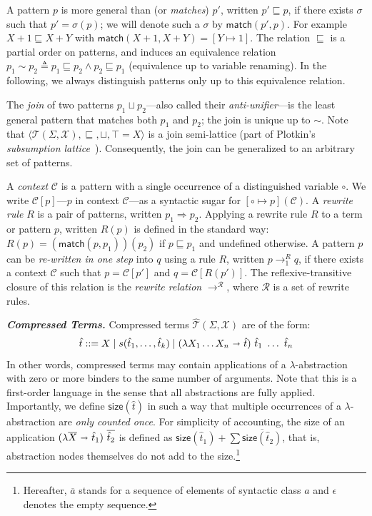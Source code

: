 \documentclass[acmsmall,screen,nonacm,review=false,timestamp=false]{acmart}
\newcommand{\emphbf}[1]{\emph{\textbf{#1}\xspace}}
\newcommand{\mypara}[1]{\smallskip\noindent\emphbf{#1.}\xspace}
\newcommand{\many}[1]{\overline{#1}}
\newcommand{\sz}{\mathsf{size}}
\newcommand{\patsof}[2]{\mathcal{T}(#1,#2)}
\newcommand{\absof}[2]{\hat{\mathcal{T}}(#1,#2)}
\newcommand{\subst}[2]{{#1} \mapsto {#2}}
\newcommand{\sapp}[2]{{#1}({#2})}
\newcommand{\sub}{\sqsubseteq}
\newcommand{\join}{\sqcup}
\newcommand{\bnd}{\ \mathbf{\shortrightarrow}\ }
\newcommand{\match}[2]{\mathsf{match}(#1,#2)}
\newcommand{\rwsteps}[1]{\rightarrow^{#1}_1}
\newcommand{\rewrites}[1]{\rightarrow^{#1}}
\newcommand{\emptyseq}{\epsilon}
\newcommand{\ctx}{\mathcal{C}}
\newcommand{\ruleset}{\mathcal{R}}
\begin{document}
A pattern $p$ is more general than (or \emph{matches}) $p'$,
written $p' \sub p$,
if there exists $\sigma$ such that $p' = \sapp{\sigma}{p}$;
we will denote such a $\sigma$ by $\match{p'}{p}$.
For example $X + 1 \sub X + Y$ with $\match{X + 1}{X + Y} = [\subst{Y}{1}]$.
The relation $\sub$ is a partial order on patterns,
and induces an equivalence relation $p_1 \sim p_2 \triangleq p_1 \sub p_2 \wedge p_2 \sub p_1$
(equivalence up to variable renaming).
In the following, we always distinguish patterns only up to this equivalence relation. 

The \emph{join} of two patterns $p_1 \join p_2$---also called their \emph{anti-unifier}---is the least general pattern that matches both $p_1$ and $p_2$;
the join is unique up to $\sim$.
Note that $\langle \patsof{\Sigma}{\mathcal{X}}, \sub, \join, \top = X \rangle$ is a join semi-lattice
(part of Plotkin's \emph{subsumption lattice}~\cite{plotkin1970lattice}).
Consequently, the join can be generalized to an arbitrary set of patterns.

A \emph{context} $\ctx$ is a pattern with a single occurrence of a distinguished variable $\circ$.
We write $\ctx[p]$---$p$ in context $\ctx$---as a syntactic sugar for $\sapp{[\subst{\circ}{p}]}{\ctx}$.
A \emph{rewrite rule} $R$ is a pair of patterns, written $p_1 \Rightarrow p_2$.
Applying a rewrite rule $R$ to a term or pattern $p$, written $\sapp{R}{p}$ is defined in the standard way:
$\sapp{R}{p} = \sapp{(\match{p}{p_1})}{p_2}$ if $p \sub p_1$ and undefined otherwise.
A pattern $p$ can be \emph{re-written in one step} into $q$ using a rule $R$,
written $p \rwsteps{R} q$, 
if there exists a context $\ctx$ such that $p = \ctx[p']$ and $q = \ctx[\sapp{R}{p'}]$.
The reflexive-transitive closure of this relation is the \emph{rewrite relation} $\rewrites{\ruleset}$,
where $\ruleset$ is a set of rewrite rules.

\mypara{Compressed Terms}
Compressed terms $\absof{\Sigma}{\mathcal{X}}$ are of the form:
$$
\hat{t} ::= X   \mid   s(\hat{t}_1,\ldots,\hat{t}_k)     \mid (\lambda X_1 \ldots X_n \bnd \hat{t})\ \hat{t}_1\ \ldots\ \hat{t}_n  
$$
In other words,
compressed terms may contain applications of a $\lambda$-abstraction with zero or more binders
to the same number of arguments.
Note that this is a first-order language in the sense that all abstractions are fully applied.
Importantly, we define $\sz(\hat{t})$ in such a way 
that multiple occurrences of a $\lambda$-abstraction are \emph{only counted once}.
For simplicity of accounting, the size of an application $(\lambda \many{X} \bnd \hat{t}_1)\ \many{\hat{t}_2}$
is defined as $\sz(\hat{t}_1) + \sum{\many{\sz(\hat{t}_2)}}$,
that is, abstraction nodes themselves do not add to the size.\footnote{Hereafter, $\many{a}$ stands for a sequence of elements of syntactic class $a$ and $\emptyseq$ denotes the empty sequence.}  
\end{document}
